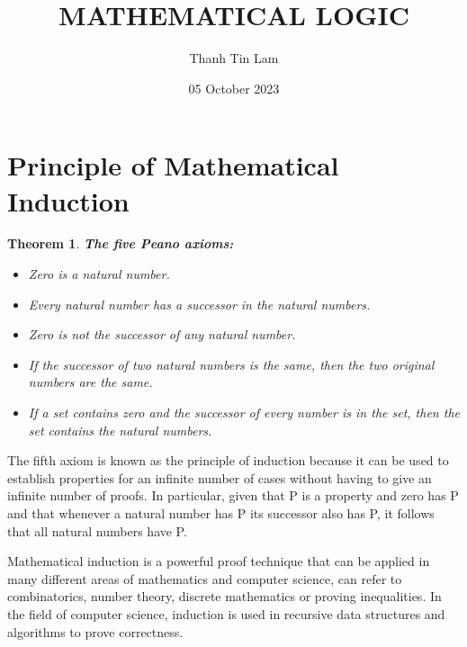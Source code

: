 \documentclass{article}
\title{\textbf{MATHEMATICAL LOGIC}}
\author{ Thanh Tin Lam}
\date{ 05 October 2023}
\newtheorem{theorem}{Theorem}[section]
\begin{document}
\maketitle
\vspace{2cm}
\section{Principle of Mathematical Induction}

\begin{theorem}{\textbf{The five Peano axioms:}}
    \begin{itemize}
        \item Zero is a natural number.
        \item Every natural number has a successor in the natural numbers.
        \item Zero is not the successor of any natural number.
        \item If the successor of two natural numbers is the same, then the two original numbers are the same.
        \item If a set contains zero and the successor of every number is in the set, then the set contains the natural numbers.
    \end{itemize}
\end{theorem}

\hspace{2mm} The fifth axiom is known as the principle of induction because it can be used to establish properties for an infinite number of cases without having to give an infinite number of proofs. In particular, given that P is a property and zero has P and that whenever a natural number has P its successor also has P, it follows that all natural numbers have P.\\
\vspace{1mm}

\hspace{2mm} Mathematical induction is a powerful proof technique that can be applied in many different areas of mathematics and computer science, can refer to combinatorics, number theory, discrete mathematics or proving inequalities. In the field of computer science, induction is used in recursive data structures and algorithms to prove correctness.
\end{document}
